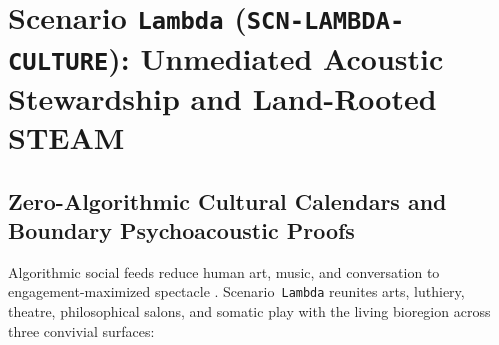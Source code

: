 \section{Scenario \texttt{Lambda} (\texttt{SCN-LAMBDA-CULTURE}): Unmediated Acoustic Stewardship and Land-Rooted STEAM}
\label{sec:wave-e-lambda}

\subsection{Zero-Algorithmic Cultural Calendars and Boundary Psychoacoustic Proofs}

Algorithmic social feeds reduce human art, music, and conversation to engagement-maximized spectacle \parencite{zuboff2019}. Scenario~\texttt{Lambda} reunites arts, luthiery, theatre, philosophical salons, and somatic play with the living bioregion across three convivial surfaces:
